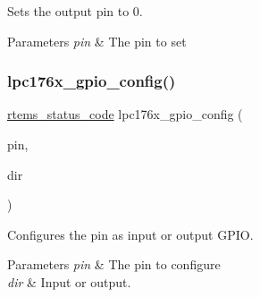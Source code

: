 Sets the output pin to 0. 


\begin{DoxyParams}{Parameters}
{\em pin} & The pin to set \\
\hline
\end{DoxyParams}
\mbox{\label{lpc-gpio_8c_a7a76b077d3ffba00d57d0b9b7ede28f2}} 
\subsubsection{\texorpdfstring{lpc176x\_gpio\_config()}{lpc176x\_gpio\_config()}}
{\footnotesize\ttfamily \mbox{\hyperlink{group__ClassicStatus_ga545d41846817eaba6143d52ee4d9e9fe}{rtems\+\_\+status\+\_\+code}} lpc176x\+\_\+gpio\+\_\+config (\begin{DoxyParamCaption}\item[{\mbox{\hyperlink{common-types_8h_a8215ced1557c43bc5925b691a3c1dc23}{lpc176x\+\_\+pin\+\_\+number}}}]{pin,  }\item[{\mbox{\hyperlink{gpio-defs_8h_a0c9e959ab33ca3965f03caf07c8ecc17}{lpc176x\+\_\+gpio\+\_\+direction}}}]{dir }\end{DoxyParamCaption})}



Configures the pin as input or output G\+P\+IO. 


\begin{DoxyParams}{Parameters}
{\em pin} & The pin to configure \\
\hline
{\em dir} & Input or output. \\
\hline
\end{DoxyParams}
\mbox{\label{lpc-gpio_8c_a94a3ba04eb2443625898f44b797acdfe}} 

